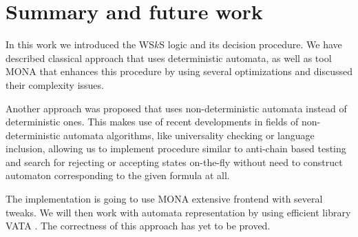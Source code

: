 \chapter{Summary and future work}\label{summary}

In this work we introduced the WS$k$S logic and its decision procedure. We have described classical approach that uses deterministic automata, as well as tool \textsc{MONA} that enhances this procedure by using several optimizations and discussed their complexity issues. 

Another approach was proposed that uses non-deterministic automata instead of deterministic ones. This makes use of recent developments in fields of non-deterministic automata algorithms, like universality checking or language inclusion, allowing us to implement procedure similar to anti-chain based testing \cite{tacas} and search for rejecting or accepting states on-the-fly without need to construct automaton corresponding to the given formula at all.

The implementation is going to use \textsc{MONA} extensive frontend with several tweaks. We will then work with automata representation by using efficient library \textsc{VATA} \cite{vata}. The correctness of this approach has yet to be proved.

